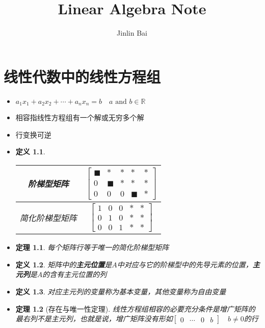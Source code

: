 \documentclass[UTF8]{report}
\author{Jinlin Bai}
\title{Linear Algebra Note}
\begin{document}
	\maketitle
	\tableofcontents
	\newpage
	\newtheorem{define}{定义}
	\newtheorem{theorem}{定理}
	\chapter{线性代数中的线性方程组}
	\begin{itemize}
		\item $a_1 x_1 + a_2 x_2 + \cdots + a_n x_n = b \quad a \textrm{ and } b\in \mathbb{R}$
		\item 相容指线性方程组有一个解或无穷多个解 
		\item 行变换可逆
		\item \begin{define}
			\begin{tabular}{|c|c|}
				\hline
				阶梯型矩阵 & $\begin{bmatrix}
					\blacksquare & * & * & * & * \\
					0 & \blacksquare & * & * & * \\
					0 & 0 & 0 & \blacksquare & *
				\end{bmatrix}$ \\
				\hline
				简化阶梯型矩阵 & $\begin{bmatrix}
					1 & 0 & 0 & * & * \\
					0 & 1 & 0 & * & * \\
					0 & 0 & 1 & * & *
				\end{bmatrix}$\\
				\hline
			\end{tabular}
		\end{define}
		\item \begin{theorem}
			每个矩阵行等于唯一的简化阶梯型矩阵
		\end{theorem}
		\item \begin{define}
			矩阵中的\textbf{主元位置}是$A$中对应与它的阶梯型中的先导元素的位置，\textbf{主元列}是$A$的含有\textit{主元位置}的列
		\end{define}
		\item \begin{define}
			对应主元列的变量称为基本变量，其他变量称为自由变量
			\end{define}
		\item \begin{theorem}[存在与唯一性定理]
			线性方程组相容的必要充分条件是增广矩阵的最右列不是主元列，也就是说，增广矩阵没有形如$\begin{bmatrix} 0 & \cdots & 0 & b \end{bmatrix}\quad b \neq 0$的行
		\end{theorem}
	\end{itemize}
\end{document}
